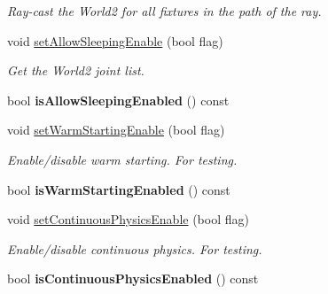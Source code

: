 \begin{DoxyCompactItemize}
\begin{DoxyCompactList}\small\item\em Ray-\/cast the World2 for all fixtures in the path of the ray. \end{DoxyCompactList}\item 
void \hyperlink{class_magnum_1_1_physics3_1_1_world_ab1bd5b99186bd33631630172ecb58b2a}{set\+Allow\+Sleeping\+Enable} (bool flag)
\begin{DoxyCompactList}\small\item\em Get the World2 joint list. \end{DoxyCompactList}\item 
bool {\bfseries is\+Allow\+Sleeping\+Enabled} () const \hypertarget{class_magnum_1_1_physics3_1_1_world_abc60cff9f8aa01e044692a8231e87b77}{}\label{class_magnum_1_1_physics3_1_1_world_abc60cff9f8aa01e044692a8231e87b77}

\item 
void \hyperlink{class_magnum_1_1_physics3_1_1_world_ae8ed295bce3af9cc6b9e0d2635400378}{set\+Warm\+Starting\+Enable} (bool flag)\hypertarget{class_magnum_1_1_physics3_1_1_world_ae8ed295bce3af9cc6b9e0d2635400378}{}\label{class_magnum_1_1_physics3_1_1_world_ae8ed295bce3af9cc6b9e0d2635400378}

\begin{DoxyCompactList}\small\item\em Enable/disable warm starting. For testing. \end{DoxyCompactList}\item 
bool {\bfseries is\+Warm\+Starting\+Enabled} () const \hypertarget{class_magnum_1_1_physics3_1_1_world_a3c0bfde3b0197e8f8aaf586036d74862}{}\label{class_magnum_1_1_physics3_1_1_world_a3c0bfde3b0197e8f8aaf586036d74862}

\item 
void \hyperlink{class_magnum_1_1_physics3_1_1_world_ae69f3f481b2eb12b4c2b33e7baa1b289}{set\+Continuous\+Physics\+Enable} (bool flag)\hypertarget{class_magnum_1_1_physics3_1_1_world_ae69f3f481b2eb12b4c2b33e7baa1b289}{}\label{class_magnum_1_1_physics3_1_1_world_ae69f3f481b2eb12b4c2b33e7baa1b289}

\begin{DoxyCompactList}\small\item\em Enable/disable continuous physics. For testing. \end{DoxyCompactList}\item 
bool {\bfseries is\+Continuous\+Physics\+Enabled} () const \hypertarget{class_magnum_1_1_physics3_1_1_world_a4e1f095e3aa01bf72fd85ac4a83a1afb}{}\label{class_magnum_1_1_physics3_1_1_world_a4e1f095e3aa01bf72fd85ac4a83a1afb}


\end{DoxyCompactItemize}
